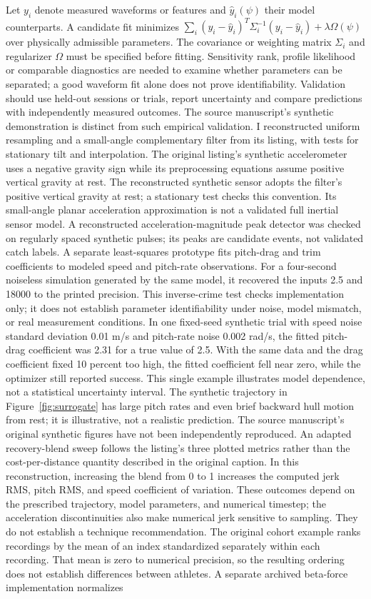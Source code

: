 \documentclass[11pt]{article}
\begin{document}
Let $y_i$ denote measured waveforms or features and $\hat y_i(\psi)$ their model counterparts. A candidate fit minimizes $\sum_i (y_i-\hat y_i)^T\Sigma_i^{-1}(y_i-\hat y_i)+\lambda\Omega(\psi)$ over physically admissible parameters. The covariance or weighting matrix $\Sigma_i$ and regularizer $\Omega$ must be specified before fitting. Sensitivity rank, profile likelihood or comparable diagnostics are needed to examine whether parameters can be separated; a good waveform fit alone does not prove identifiability. Validation should use held-out sessions or trials, report uncertainty and compare predictions with independently measured outcomes. The source manuscript's synthetic demonstration is distinct from such empirical validation. I reconstructed uniform resampling and a small-angle complementary filter from its listing, with tests for stationary tilt and interpolation. The original listing's synthetic accelerometer uses a negative gravity sign while its preprocessing equations assume positive vertical gravity at rest. The reconstructed synthetic sensor adopts the filter's positive vertical gravity at rest; a stationary test checks this convention. Its small-angle planar acceleration approximation is not a validated full inertial sensor model. A reconstructed acceleration-magnitude peak detector was checked on regularly spaced synthetic pulses; its peaks are candidate events, not validated catch labels. A separate least-squares prototype fits pitch-drag and trim coefficients to modeled speed and pitch-rate observations. For a four-second noiseless simulation generated by the same model, it recovered the inputs 2.5 and 18000 to the printed precision. This inverse-crime test checks implementation only; it does not establish parameter identifiability under noise, model mismatch, or real measurement conditions. In one fixed-seed synthetic trial with speed noise standard deviation 0.01 m/s and pitch-rate noise 0.002 rad/s, the fitted pitch-drag coefficient was 2.31 for a true value of 2.5. With the same data and the drag coefficient fixed 10 percent too high, the fitted coefficient fell near zero, while the optimizer still reported success. This single example illustrates model dependence, not a statistical uncertainty interval. The synthetic trajectory in Figure~\ref{fig:surrogate} has large pitch rates and even brief backward hull motion from rest; it is illustrative, not a realistic prediction. The source manuscript's original synthetic figures have not been independently reproduced. An adapted recovery-blend sweep follows the listing's three plotted metrics rather than the cost-per-distance quantity described in the original caption. In this reconstruction, increasing the blend from 0 to 1 increases the computed jerk RMS, pitch RMS, and speed coefficient of variation. These outcomes depend on the prescribed trajectory, model parameters, and numerical timestep; the acceleration discontinuities also make numerical jerk sensitive to sampling. They do not establish a technique recommendation. The original cohort example ranks recordings by the mean of an index standardized separately within each recording. That mean is zero to numerical precision, so the resulting ordering does not establish differences between athletes. A separate archived beta-force implementation normalizes 
\end{document}
